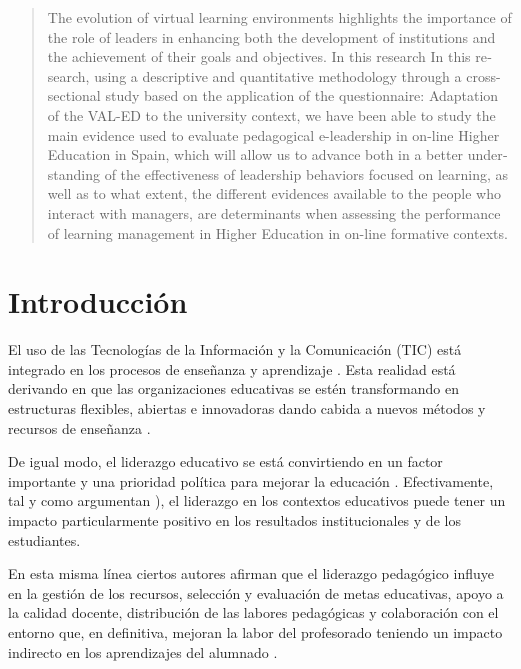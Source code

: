 \documentclass[spanish]{textolivre}
\begin{document}
\begin{polyabstract}
\begin{english}
\begin{abstract}
The evolution of virtual learning environments highlights the importance of the role of leaders in enhancing both the development of institutions and the achievement of their goals and objectives. In this research In this research, using a descriptive and quantitative methodology through a cross-sectional study based on the application of the questionnaire: Adaptation of the VAL-ED to the university context, we have been able to study the main evidence used to evaluate pedagogical e-leadership in on-line Higher Education in Spain, which will allow us to advance both in a better understanding of the effectiveness of leadership behaviors focused on learning, as well as to what extent, the different evidences available to the people who interact with managers, are determinants when assessing the performance of learning management in Higher Education in on-line formative contexts.

\end{abstract}
\end{english}
\end{polyabstract}

\section{Introducción}
El uso de las Tecnologías de la Información y la Comunicación (TIC) está integrado en los procesos de enseñanza y aprendizaje \cite{lopez_belmonte_alisis_2019}. Esta realidad está derivando en que las organizaciones educativas se estén transformando en estructuras flexibles, abiertas e innovadoras dando cabida a nuevos métodos y recursos de enseñanza \cite{palomino2021liderazgo}. 

De igual modo, el liderazgo educativo se está convirtiendo en un factor importante y una prioridad política para mejorar la educación \cite{gonzalez2020evidencia}. Efectivamente, tal y como argumentan \textcite{harris2022distributed}), el liderazgo en los contextos educativos puede tener un impacto particularmente positivo en los resultados institucionales y de los estudiantes.

En esta misma línea ciertos autores afirman que el liderazgo pedagógico influye en la gestión de los recursos, selección y evaluación de metas educativas, apoyo a la calidad docente, distribución de las labores pedagógicas y colaboración con el entorno que, en definitiva, mejoran la labor del profesorado teniendo un impacto indirecto en los aprendizajes del alumnado \cite{gonzalez2020evidencia}.
\end{document}
